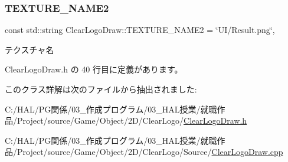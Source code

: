 \subsubsection{\texorpdfstring{T\+E\+X\+T\+U\+R\+E\+\_\+\+N\+A\+M\+E2}{TEXTURE\_NAME2}}
{\footnotesize\ttfamily const std\+::string Clear\+Logo\+Draw\+::\+T\+E\+X\+T\+U\+R\+E\+\_\+\+N\+A\+M\+E2 = \char`\"{}UI/Result.\+png\char`\"{}\hspace{0.3cm}{\ttfamily [static]}, {\ttfamily [private]}}



テクスチャ名 



 Clear\+Logo\+Draw.\+h の 40 行目に定義があります。



このクラス詳解は次のファイルから抽出されました\+:\begin{DoxyCompactItemize}
\item 
C\+:/\+H\+A\+L/\+P\+G関係/03\+\_\+作成プログラム/03\+\_\+\+H\+A\+L授業/就職作品/\+Project/source/\+Game/\+Object/2\+D/\+Clear\+Logo/\mbox{\hyperlink{_clear_logo_draw_8h}{Clear\+Logo\+Draw.\+h}}\item 
C\+:/\+H\+A\+L/\+P\+G関係/03\+\_\+作成プログラム/03\+\_\+\+H\+A\+L授業/就職作品/\+Project/source/\+Game/\+Object/2\+D/\+Clear\+Logo/\+Source/\mbox{\hyperlink{_clear_logo_draw_8cpp}{Clear\+Logo\+Draw.\+cpp}}\end{DoxyCompactItemize}
